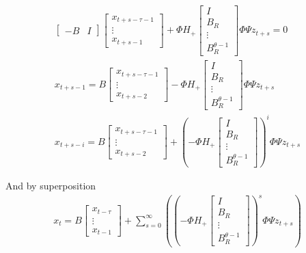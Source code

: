 \documentclass{article}
\begin{document}
{\begin{gather*}
    \begin{bmatrix}
    -B&I
  \end{bmatrix}
\begin{bmatrix}
    x_{t+s-\tau-1}\\\vdots\\x_{t+s-1}
  \end{bmatrix}+  \Phi H_+\begin{bmatrix}
I\\B_R\\\vdots\\B^{\theta-1}_R
  \end{bmatrix} \Phi\Psi z_{t+s}=0\\
x_{t+s-1} = B \begin{bmatrix}
    x_{t+s-\tau-1}\\\vdots\\x_{t+s-2} 
  \end{bmatrix}  -\Phi H_+\begin{bmatrix}
I\\B_R\\\vdots\\B^{\theta-1}_R
  \end{bmatrix} \Phi\Psi z_{t+s}\\
x_{t+s-i} = B \begin{bmatrix}
    x_{t+s-\tau-1}\\\vdots\\x_{t+s-2} 
  \end{bmatrix} + (-\Phi H_+\begin{bmatrix}
I\\B_R\\\vdots\\B^{\theta-1}_R
  \end{bmatrix})^{i} \Phi\Psi z_{t+s}
\end{gather*}

And by superposition
\begin{gather*}
x_{t} = B \begin{bmatrix}
    x_{t-\tau}\\\vdots\\x_{t-1} 
  \end{bmatrix} +\sum_{s=0}^\infty ( (-\Phi H_+\begin{bmatrix}
I\\B_R\\\vdots\\B^{\theta-1}_R
  \end{bmatrix})^{s} \Phi\Psi z_{t+s})
\end{gather*}

}
\end{document}
